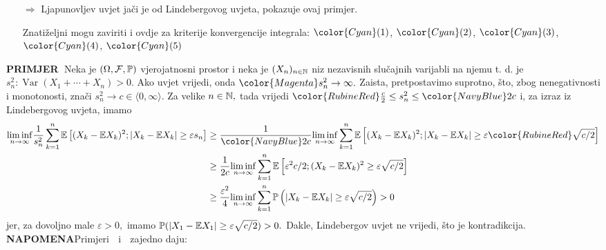 \documentclass{article}
\newcommand{\Var}{\operatorname{Var}}
\begin{document}
\begin{enumerate}
    \item[\(\Rightarrow\)] Ljapunovljev uvjet jači je od Lindebergovog uvjeta, pokazuje ovaj primjer. 
    \item[\ding{228}] Znatiželjni mogu zaviriti i ovdje za kriterije konvergencije integrala: \href{https://bpb-us-w2.wpmucdn.com/sites.wustl.edu/dist/4/2002/files/2019/07/Lecture10.pdf}{\(\color{Cyan}(1)\)}, \href{https://math.stackexchange.com/q/2726235/721644}{\(\color{Cyan}(2)\)}, \href{https://math.stackexchange.com/q/2271393/721644}{\(\color{Cyan}(3)\)}, \href{https://math.stackexchange.com/questions/3065896/convergence-of-an-improper-integral-depending-on-parameters?noredirect=1}{\(\color{Cyan}(4)\)}, \href{https://math.stackexchange.com/questions/950065/analyzing-the-series-sum-n-geq-2-frac1np-lnqn}{\(\color{Cyan}(5)\)}
\end{enumerate}
\textbf{PRIMJER}\textcolor{white}{.}\textcolor{Magenta}{\varhexstar\varhexstar}\newline 
Neka je \((\Omega,\mathcal F,\Bbb P)\) vjerojatnosni prostor i neka je \((X_n)_{n\in\Bbb N}\) niz nezavisnih slučajnih varijabli na njemu t. d. je \(s_n^2:\Var(X_1+\cdots+X_n)>0.\) Ako  uvjet vrijedi, onda \(\color{Magenta}s_n^2\to\infty.\) Zaista, pretpostavimo suprotno, što, zbog nenegativnosti i monotonosti, znači \(s_n^2\to c\in\langle0,\infty\rangle.\) Za velike \(n\in\Bbb N,\) tada vrijedi \({\color{RubineRed}\frac{c}2}\le s_n^2\le{\color{NavyBlue}2c}\) i, za izraz iz Lindebergovog uvjeta, imamo \[\begin{aligned}\underset{n\to\infty}{\lim\inf}\frac1{s_n^2}\sum_{k=1}^n\Bbb E\left[(X_k-\Bbb EX_k)^2;|X_k-\Bbb EX_k|\ge\varepsilon s_n\right]&\ge\frac1{\color{NavyBlue}2c}\underset{n\to\infty}{\lim\inf}\sum_{k=1}^n\Bbb E\left[(X_k-\Bbb EX_k)^2;|X_k-\Bbb EX_k|\ge\varepsilon{\color{RubineRed}\sqrt{c/2}}\right]\\&\ge\frac1{2c}\underset{n\to\infty}{\lim\inf}\sum_{k=1}^n\Bbb E\left[\varepsilon^2c/2;(X_k-\Bbb EX_k)^2\ge\varepsilon\sqrt{c/2}\right]\\&\ge\frac{\varepsilon^2}4\underset{n\to\infty}{\lim\inf}\sum_{k=1}^n\Bbb P\left(|X_k-\Bbb EX_k|\ge\varepsilon\sqrt{c/2}\right)>0\end{aligned}\] jer, za dovoljno male \(\varepsilon>0,\) imamo \(\Bbb P(|X_1-\Bbb EX_1|\ge\varepsilon\sqrt{c/2})>0.\) Dakle, Lindebergov uvjet ne vrijedi, što je kontradikcija.\newline\newline
{}\textbf{NAPOMENA}\newline Primjeri \textcolor{Magenta}{\hexstar}\textcolor{white}{.} i \textcolor{Magenta}{\hexstar\hexstar}\textcolor{white}{.} zajedno daju:
\end{document}
